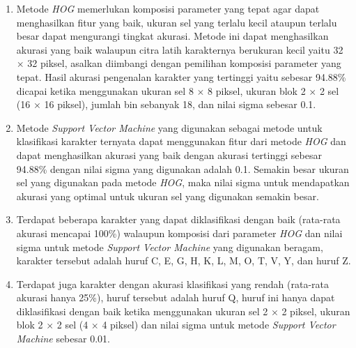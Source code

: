 \begin{enumerate}
\item  Metode \textit{HOG} memerlukan komposisi parameter yang tepat agar dapat menghasilkan fitur yang baik, ukuran sel yang terlalu kecil ataupun terlalu besar dapat mengurangi tingkat akurasi. Metode ini dapat menghasilkan akurasi yang baik walaupun citra latih karakternya berukuran kecil yaitu 32 $\times$ 32 piksel, asalkan diimbangi dengan pemilihan komposisi parameter yang tepat. Hasil akurasi pengenalan karakter yang tertinggi yaitu sebesar 94.88\% dicapai ketika menggunakan ukuran sel 8 $\times$ 8 piksel, ukuran blok 2 $\times$ 2 sel (16 $\times$ 16 piksel), jumlah bin sebanyak 18, dan nilai sigma sebesar 0.1.
\item Metode \textit{Support Vector Machine} yang digunakan sebagai metode untuk klasifikasi karakter ternyata dapat menggunakan fitur dari metode \textit{HOG} dan dapat menghasilkan akurasi yang baik dengan akurasi tertinggi sebesar 94.88\% dengan nilai sigma yang digunakan adalah 0.1. Semakin besar ukuran sel yang digunakan pada metode \textit{HOG}, maka nilai sigma untuk mendapatkan akurasi yang optimal untuk ukuran sel yang digunakan semakin besar.
\item Terdapat beberapa karakter yang dapat diklasifikasi dengan baik (rata-rata akurasi mencapai 100\%) walaupun komposisi dari parameter \textit{HOG} dan nilai sigma untuk metode \textit{Support Vector Machine} yang digunakan beragam, karakter tersebut adalah huruf C, E, G, H, K, L, M, O, T, V, Y, dan huruf Z.
\item Terdapat juga karakter dengan akurasi klasifikasi yang rendah (rata-rata akurasi hanya 25\%), huruf tersebut adalah huruf Q, huruf ini hanya dapat diklasifikasi dengan baik ketika menggunakan ukuran sel 2 $\times$ 2 piksel, ukuran blok 2 $\times$ 2 sel (4 $\times$ 4 piksel) dan nilai sigma untuk metode \textit{Support Vector Machine} sebesar 0.01.\\
\end{enumerate}

